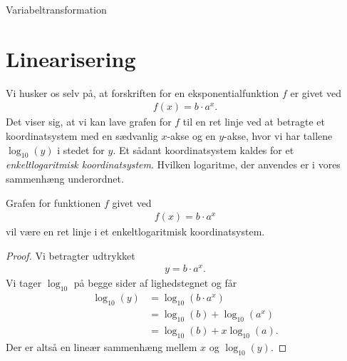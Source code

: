 \documentclass[12pt]{article}
\begin{document}




\begin{center}
	\Huge
	Variabeltransformation
\end{center}

\section*{Linearisering}

Vi husker os selv på, at forskriften for en eksponentialfunktion $f$ er givet ved
\begin{align*}
	f(x) = b\cdot a^x.
\end{align*}
Det viser sig, at vi kan lave grafen for $f$ til en ret linje ved at betragte et koordinatsystem med en sædvanlig $x$-akse og en $y$-akse, hvor vi har tallene $\log_{10}(y)$ i stedet for $y$. Et sådant koordinatsystem kaldes for et \textit{enkeltlogaritmisk koordinatsystem}. Hvilken logaritme, der anvendes er i vores sammenhæng underordnet.
\begin{setn}
	Grafen for funktionen $f$ givet ved
	\begin{align*}
		f(x) = b\cdot a^x
	\end{align*}
	vil være en ret linje i et enkeltlogaritmisk koordinatsystem.
\end{setn}
\begin{proof}
	Vi betragter udtrykket
	\begin{align*}
		y = b\cdot a^x.
	\end{align*}
	Vi tager $\log_{10}$ på begge sider af lighedstegnet og får
	\begin{align*}
		\log_{10}(y) &= \log_{10}(b\cdot a^x)\\
		&= \log_{10}(b) + \log_{10}(a^x)\\
		&= \log_{10}(b) + x\log_{10}(a).
	\end{align*}
	Der er altså en lineær sammenhæng mellem $x$ og $\log_{10}(y)$. 
\end{proof}
\end{document}

